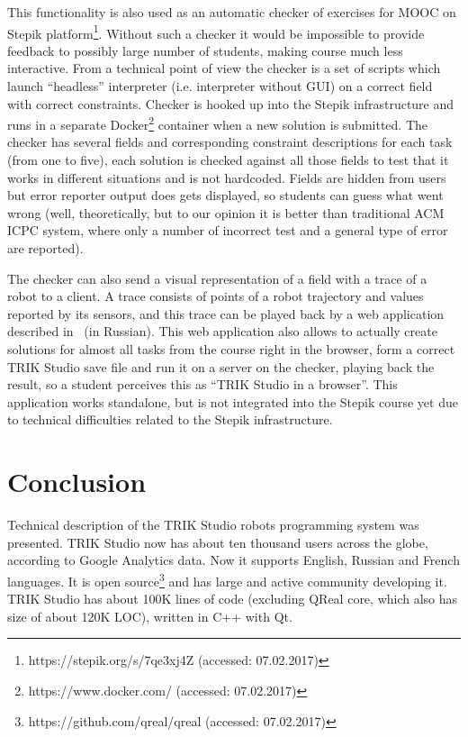 \documentclass[conference]{IEEEtran}
\begin{document}
This functionality is also used as an automatic checker of exercises for MOOC on Stepik platform\footnote{https://stepik.org/s/7qe3xj4Z (accessed: 07.02.2017)}. Without such a checker it would be impossible to provide feedback to possibly large number of students, making course much less interactive. From a technical point of view the checker is a set of scripts which launch "`headless"' interpreter (i.e. interpreter without GUI) on a correct field with correct constraints. Checker is hooked up into the Stepik infrastructure and runs in a separate Docker\footnote{https://www.docker.com/ (accessed: 07.02.2017)} container when a new solution is submitted. The checker has several fields and corresponding constraint descriptions for each task (from one to five), each solution is checked against all those fields to test that it works in different situations and is not hardcoded. Fields are hidden from users but error reporter output does gets displayed, so students can guess what went wrong (well, theoretically, but to our opinion it is better than traditional ACM ICPC system, where only a number of incorrect test and a general type of error are reported).

The checker can also send a visual representation of a field with a trace of a robot to a client. A trace consists of points of a robot trajectory and values reported by its sensors, and this trace can be played back by a web application described in~\cite{zakharov2016web} (in Russian). This web application also allows to actually create solutions for almost all tasks from the course right in the browser, form a correct TRIK Studio save file and run it on a server on the checker, playing back the result, so a student perceives this as "`TRIK Studio in a browser"'. This application works standalone, but is not integrated into the Stepik course yet due to technical difficulties related to the Stepik infrastructure.

\section*{Conclusion}
\label{chapter:conclusion}

Technical description of the TRIK Studio robots programming system was presented. TRIK Studio now has about ten thousand users across the globe, according to Google Analytics data. Now it supports English, Russian and French languages. It is open source\footnote{https://github.com/qreal/qreal (accessed: 07.02.2017)} and has large and active community developing it. TRIK Studio has about 100K lines of code (excluding QReal core, which also has size of about 120K LOC), written in C++ with Qt.
\end{document}
